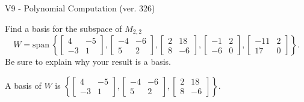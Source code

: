 \begin{exercise}
  \begin{exerciseTitle}V9 - Polynomial Computation (ver. 326)\end{exerciseTitle}
  \begin{exerciseStatement}
    Find a basis for the subspace of \(M_{2,2}\) 
\[W=\mathrm{span}\ \left\{\left[\begin{array}{cc}
4 & -5 \\
-3 & 1
\end{array}\right] , \left[\begin{array}{cc}
-4 & -6 \\
5 & 2
\end{array}\right] , \left[\begin{array}{cc}
2 & 18 \\
8 & -6
\end{array}\right] , \left[\begin{array}{cc}
-1 & 2 \\
-6 & 0
\end{array}\right] , \left[\begin{array}{cc}
-11 & 2 \\
17 & 0
\end{array}\right]\right\}.\]
 Be sure to explain why your result is a basis.


  \end{exerciseStatement}
  \begin{exerciseAnswer}
   A basis of \(W\) is  \(\left\{\left[\begin{array}{cc}
4 & -5 \\
-3 & 1
\end{array}\right] , \left[\begin{array}{cc}
-4 & -6 \\
5 & 2
\end{array}\right] , \left[\begin{array}{cc}
2 & 18 \\
8 & -6
\end{array}\right]\right\}\).
  


  \end{exerciseAnswer}
\end{exercise}